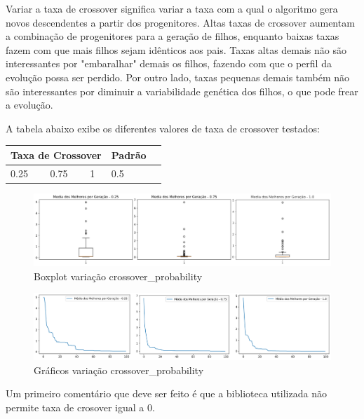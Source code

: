 \documentclass[12pt]{article}
\begin{document}
	Variar a taxa de crossover significa variar a taxa com a qual o algoritmo gera novos descendentes a partir dos progenitores. Altas taxas de crossover aumentam a combinação de progenitores para a geração de filhos, enquanto baixas taxas fazem com que mais filhos sejam idênticos aos pais. Taxas altas demais não são interessantes por "embaralhar" demais os filhos, fazendo com que o perfil da evolução possa ser perdido. Por outro lado, taxas pequenas demais também não são interessantes por diminuir a variabilidade genética dos filhos, o que pode frear a evolução.
	
	A tabela abaixo exibe os diferentes valores de taxa de crossover testados:
	
	\begin{table}[H]
		\centering
		\begin{tabular}{|l|l|l|l|l|}
			\hline
			\multicolumn{3}{|l|}{Taxa de Crossover} & Padrão \\ \hline
			0.25    & 0.75    & 1   &0.5 \\ \hline
		\end{tabular}
	\end{table}
	
	\begin{figure}[H]
		\centering
		\includegraphics[width=0.9\linewidth]{Imagens/crossover/boxplotTaxaCross}
		\caption{Boxplot variação crossover\_probability}
		\label{fig:boxplottaxacross}
	\end{figure}
	\begin{figure}[H]
		\centering
		\includegraphics[width=0.9\linewidth]{Imagens/crossover/graficoTaxaCross}
		\caption{Gráficos variação crossover\_probability}
		\label{fig:graficotaxacross}
	\end{figure}
	
	Um primeiro comentário que deve ser feito é que a biblioteca utilizada não permite taxa de crosover igual a 0.
	
\end{document}
